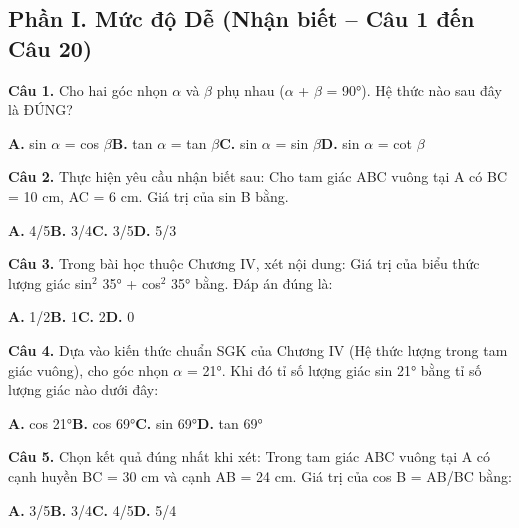 \documentclass[11pt,a4paper]{article}
\begin{document}
\subsection*{\color{accent} Phần I. Mức độ Dễ (Nhận biết -- Câu 1 đến Câu 20)}
\textbf{\color{primary} Câu 1.} Cho hai góc nhọn $\alpha$ và $\beta$ phụ nhau ($\alpha$ + $\beta$ = 90°). Hệ thức nào sau đây là ĐÚNG?\par
\hspace*{1.5em}\textbf{A.} sin $\alpha$ = cos $\beta$\quad\quad \textbf{B.} tan $\alpha$ = tan $\beta$\quad\quad \textbf{C.} sin $\alpha$ = sin $\beta$\quad\quad \textbf{D.} sin $\alpha$ = cot $\beta$\par\vspace{2pt}
\textbf{\color{primary} Câu 2.} Thực hiện yêu cầu nhận biết sau: Cho tam giác ABC vuông tại A có BC = 10 cm, AC = 6 cm. Giá trị của sin B bằng.\par
\hspace*{1.5em}\textbf{A.} 4/5\quad\quad \textbf{B.} 3/4\quad\quad \textbf{C.} 3/5\quad\quad \textbf{D.} 5/3\par\vspace{2pt}
\textbf{\color{primary} Câu 3.} Trong bài học thuộc Chương IV, xét nội dung: Giá trị của biểu thức lượng giác sin$^2$ 35° + cos$^2$ 35° bằng. Đáp án đúng là:\par
\hspace*{1.5em}\textbf{A.} 1/2\quad\quad \textbf{B.} 1\quad\quad \textbf{C.} 2\quad\quad \textbf{D.} 0\par\vspace{2pt}
\textbf{\color{primary} Câu 4.} Dựa vào kiến thức chuẩn SGK của Chương IV (Hệ thức lượng trong tam giác vuông), cho góc nhọn $\alpha$ = 21°. Khi đó tỉ số lượng giác sin 21° bằng tỉ số lượng giác nào dưới đây:\par
\hspace*{1.5em}\textbf{A.} cos 21°\quad\quad \textbf{B.} cos 69°\quad\quad \textbf{C.} sin 69°\quad\quad \textbf{D.} tan 69°\par\vspace{2pt}
\textbf{\color{primary} Câu 5.} Chọn kết quả đúng nhất khi xét: Trong tam giác ABC vuông tại A có cạnh huyền BC = 30 cm và cạnh AB = 24 cm. Giá trị của cos B = AB/BC bằng:\par
\hspace*{1.5em}\textbf{A.} 3/5\quad\quad \textbf{B.} 3/4\quad\quad \textbf{C.} 4/5\quad\quad \textbf{D.} 5/4\par\vspace{2pt}
\end{document}
